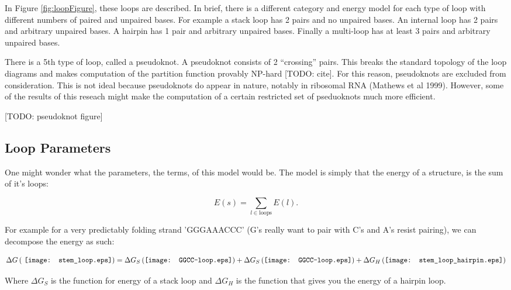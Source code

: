 In Figure \ref{fig:loopFigure}, these loops are described. In brief,
there is a different category and energy model for each type of loop
with different numbers of paired and unpaired bases. For example a
stack loop has 2 pairs and no unpaired bases. An internal loop has 2
pairs and arbitrary unpaired bases. A hairpin has 1 pair and arbitrary
unpaired bases. Finally a multi-loop has at least 3 pairs and
arbitrary unpaired bases. 

There is a 5th type of loop, called a pseudoknot. A pseudoknot
consists of 2 ``crossing'' pairs. This breaks the standard topology of
the loop diagrams and makes computation of the partition function
provably NP-hard [TODO: cite]. For this reason, pseudoknots are
excluded from consideration. This is not ideal because pseudoknots do
appear in nature, notably in ribosomal RNA (Mathews et al
1999). However, some of the results of this reseach might make the
computation of a certain restricted set of pseduoknots much more
efficient. 

[TODO: pseudoknot figure]

\subsection{Loop Parameters} 

One might wonder what the parameters, the terms, of this model would
be. The model is simply that the energy of a structure, is the sum of it's loops:

\begin{equation}
E(s) = \sum_{l \in \text{loops}} E(l).
\end{equation}

For example for a very predictably folding strand 'GGGAAACCC' (G's
really want to pair with C's and A's resist pairing), we can decompose
the energy as such:

\begin{equation}
\Delta G \left ( \vcenter{\hbox{ \texttt{[image: stem\_loop.eps]}}}
 \right ) =
\Delta G_S \left ( \vcenter{\hbox{\texttt{[image: GGCC-loop.eps]}}}
\right ) +
\Delta G_S \left ( \vcenter{\hbox{\texttt{[image: GGCC-loop.eps]}}}
\right ) + 
\Delta G_H \left (\vcenter{\hbox{\texttt{[image: stem\_loop\_hairpin.eps]}}}
\right )
\label{eq:decomposition}
\end{equation}

Where $\Delta G_S$ is the function for energy of a stack loop and
$\Delta G_H$ is the function that gives you the energy of a hairpin
loop.

